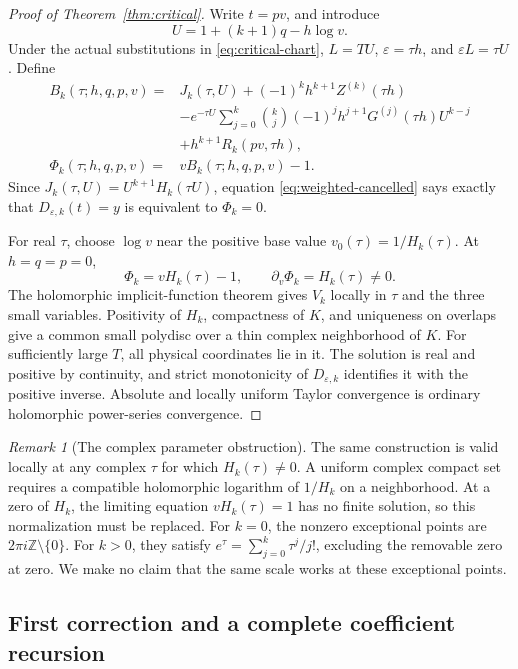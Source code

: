 \documentclass[11pt,a4paper]{article}
\numberwithin{equation}{section}
\theoremstyle{definition}
\theoremstyle{remark}
\newtheorem{remark}[theorem]{Remark}
\newcommand{\eps}{\varepsilon}
\begin{document}
\begin{proof}[Proof of Theorem~\ref{thm:critical}]
Write \(t=pv\), and introduce
\[
 U=1+(k+1)q-h\log v.
\]
Under the actual substitutions in \eqref{eq:critical-chart},
\(L=TU\), \(\eps=\tau h\), and \(\eps L=\tau U\).
Define
\begin{align}
 B_k(\tau;h,q,p,v)={}&J_k(\tau,U)
       +(-1)^kh^{k+1}Z^{(k)}(\tau h)
 \nonumber\\
 &-e^{-\tau U}\sum_{j=0}^k
   \binom{k}{j}(-1)^jh^{j+1}G^{(j)}(\tau h)U^{k-j}
 \nonumber\\
 &+h^{k+1}R_k(pv,\tau h),
 \label{eq:Bcritical}\\
 \Phi_k(\tau;h,q,p,v)={}&vB_k(\tau;h,q,p,v)-1.
 \label{eq:Phicritical}
\end{align}
Since \(J_k(\tau,U)=U^{k+1}H_k(\tau U)\), equation
\eqref{eq:weighted-cancelled} says exactly that \(D_{\eps,k}(t)=y\)
is equivalent to \(\Phi_k=0\).

For real \(\tau\), choose \(\log v\) near the positive base value
\(v_0(\tau)=1/H_k(\tau)\).
At \(h=q=p=0\),
\[
 \Phi_k=vH_k(\tau)-1,\qquad
 \partial_v\Phi_k=H_k(\tau)\ne0.
\]
The holomorphic implicit-function theorem gives \(V_k\) locally in
\(\tau\) and the three small variables.  Positivity of \(H_k\),
compactness of \(K\), and uniqueness on overlaps give a common small
polydisc over a thin complex neighborhood of \(K\).
For sufficiently large \(T\), all physical coordinates lie in it.
The solution is real and positive by continuity, and strict
monotonicity of \(D_{\eps,k}\) identifies it with the positive inverse.
Absolute and locally uniform Taylor convergence is ordinary
holomorphic power-series convergence.
\end{proof}

\begin{remark}[The complex parameter obstruction]
The same construction is valid locally at any complex \(\tau\) for which
\(H_k(\tau)\ne0\).  A uniform complex compact set requires a compatible
holomorphic logarithm of \(1/H_k\) on a neighborhood.
At a zero of \(H_k\), the limiting equation \(vH_k(\tau)=1\) has no
finite solution, so this normalization must be replaced.
For \(k=0\), the nonzero exceptional points are
\(2\pi i\mathbb Z\setminus\{0\}\).
For \(k>0\), they satisfy
\(e^\tau=\sum_{j=0}^k\tau^j/j!\), excluding the removable zero at zero.
We make no claim that the same scale works at these exceptional points.
\end{remark}

\subsection{First correction and a complete coefficient recursion}
\end{document}
